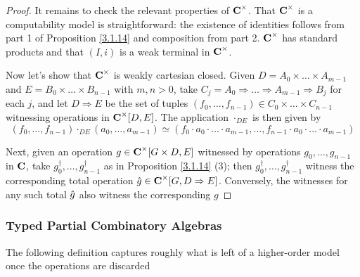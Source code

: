 \documentclass[11pt]{article}
\begin{document}
\begin{proof}
It remains to check the relevant properties of \(\operatorname{\textbf{C}}^\times\). That \(\operatorname{\textbf{C}}^\times\) is a computability model is
straightforward: the existence of identities follows from part 1 of Proposition \ref{3.1.14}
and composition from part 2. \(\operatorname{\textbf{C}}^\times\) has standard products and that \((I,i)\) is a weak terminal
in \(\operatorname{\textbf{C}}^\times\).

Now let's show that \(\operatorname{\textbf{C}}^\times\) is weakly cartesian closed. Given \(D=A_0\times\dots\times A_{m-1}\)
and \(E=B_0\times\dots\times B_{n-1}\) with \(m,n>0\), take \(C_j=A_0\Rightarrow\dots\Rightarrow A_{m-1}\Rightarrow B_j\) for each \(j\), and
let \(D\Rightarrow E\) be the set of tuples \((f_0,\dots,f_{n-1})\in C_0\times\dots\times C_{n-1}\) witnessing operations
in \(\operatorname{\textbf{C}}^\times[D,E]\). The application \(\cdot_{DE}\) is then given by
\begin{equation*}
(f_0,\dots,f_{n-1})\cdot_{DE}(a_0,\dots,a_{m-1})\simeq(f_0\cdot a_0\cdot\dots\cdot a_{m-1},\dots,f_{n-1}\cdot a_0\cdot\dots\cdot a_{m-1})
\end{equation*}

Next, given an operation \(g\in\operatorname{\textbf{C}}^\times[G\times D,E]\) witnessed by operations \(g_0,\dots,g_{n-1}\) in \(\operatorname{\textbf{C}}\),
take \(g_0^\dagger,\dots,g_{n-1}^\dagger\) as in Proposition \ref{3.1.14} (3); then \(g_0^\dagger,\dots,g_{n-1}^\dagger\) witness
the corresponding total operation \(\hat{g}\in\operatorname{\textbf{C}}^\times[G,D\Rightarrow E]\). Conversely, the witnesses for any such
total \(\hat{g}\) also witness the corresponding \(g\)
\end{proof}
\subsubsection{Typed Partial Combinatory Algebras}
\label{sec:orgebd661f}
The following definition captures roughly what is left of a higher-order model once the
operations are discarded
\end{document}
